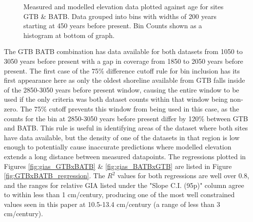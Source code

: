 \begin{figure}[H]
	\caption{Measured and modelled elevation data plotted against age for sites GTB \& BATB. Data grouped into bins with widths of 200 years starting at 450 years before present. Bin Counts shown as a histogram at bottom of graph.}	
	\label{fig:data_GTBxBATB}
\end{figure}
The GTB BATB combination has data available for both datasets from 1050 to 3050 years before present with 
a gap in coverage from 1850 to 2050 years before present. The first case of the
75\% difference cutoff rule for bin inclusion has its first appearance here as
only the oldest shoreline available from GTB falls inside of the 2850-3050 years
before present window, causing the entire window to be
used if the only criteria was both dataset counts within that window being non-zero.
The 75\% cutoff prevents this window from being used in this case, as the counts
for the bin at 2850-3050 years before present differ by 120\% between GTB and BATB. This rule is useful in identifying
areas of the dataset where both sites have data available, but the density of
one of the datasets in that region is low enough to potentially cause inaccurate
predictions where modelled elevation extends a long distance between measured datapoints.
The regressions plotted in
Figures \ref{fig:gias_GTBxBATB} \& \ref{fig:gias_BATBxGTB} are listed in 
Figure \ref{fig:GTBxBATB_regression}. The $R^2$ values for both regressions
are well over 0.8, and the ranges for relative GIA listed under the "Slope C.I. (95p)" column
agree to within less than 1 cm/century,
producing one of the most well constrained values seen in this paper at 10.5-13.4 cm/century (a range of less than 3 cm/century). \\


